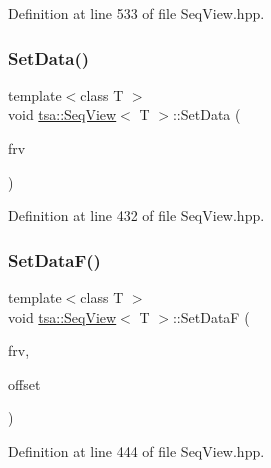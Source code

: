 Definition at line 533 of file Seq\+View.\+hpp.

\mbox{\label{classtsa_1_1_seq_view_aa9ea4a618201643a56a39878d3395ff4}} 
\subsubsection{\texorpdfstring{Set\+Data()}{SetData()}}
{\footnotesize\ttfamily template$<$class T $>$ \\
void \hyperlink{classtsa_1_1_seq_view}{tsa\+::\+Seq\+View}$<$ T $>$\+::Set\+Data (\begin{DoxyParamCaption}\item[{Fr\+Vect $\ast$}]{frv }\end{DoxyParamCaption})\hspace{0.3cm}{\ttfamily [inline]}}



Definition at line 432 of file Seq\+View.\+hpp.

\mbox{\label{classtsa_1_1_seq_view_a8d806623e7b3bcf1642a7efa142c07e0}} 
\subsubsection{\texorpdfstring{Set\+Data\+F()}{SetDataF()}}
{\footnotesize\ttfamily template$<$class T $>$ \\
void \hyperlink{classtsa_1_1_seq_view}{tsa\+::\+Seq\+View}$<$ T $>$\+::Set\+DataF (\begin{DoxyParamCaption}\item[{Fr\+Vect $\ast$}]{frv,  }\item[{double}]{offset }\end{DoxyParamCaption})\hspace{0.3cm}{\ttfamily [inline]}}



Definition at line 444 of file Seq\+View.\+hpp.

\mbox{\label{classtsa_1_1_seq_view_a3f7d84e69d6060b6681a4d72e19a4f81}} 
